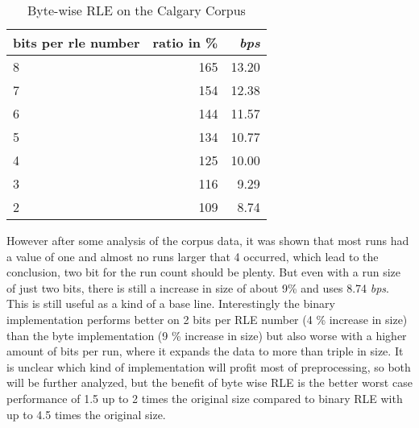 \begin{table}[h]
	\centering
	\begin{tabular}{l|r|r}
		\label{tab:t5 run length eval}
		
		bits per rle number &  ratio in \% & \textit{bps}\\
		\hline
		8 & 165 & 13.20 \\
		7 & 154 & 12.38\\
		6 & 144 & 11.57 \\
		5 & 134 & 10.77\\
		4 & 125 & 10.00\\
		3 & 116 & 9.29\\
		2 & 109 & 8.74 \\
	\end{tabular}
	\caption{Byte-wise RLE on the Calgary Corpus}
\end{table}


\par{
 However after some analysis of the corpus data, it was shown that most runs had a value of one and almost no runs larger that 4 occurred, which lead to the conclusion, two bit for the run count should be plenty. But even with a run size of just two bits, there is still a increase in size of about 9\% and uses 8.74 \textit{bps}. This is still useful as a kind of a base line. Interestingly the binary implementation performs better on 2 bits per RLE number (4 \% increase in size) than the byte implementation (9 \% increase in size) but also worse with a higher amount of bits per run, where it expands the data to more than triple in size. It is unclear which kind of implementation will profit most of preprocessing, so both will be further analyzed, but the benefit of byte wise RLE is the better worst case performance of 1.5 up to 2 times the original size compared to binary RLE with up to 4.5 times the original size.
}

